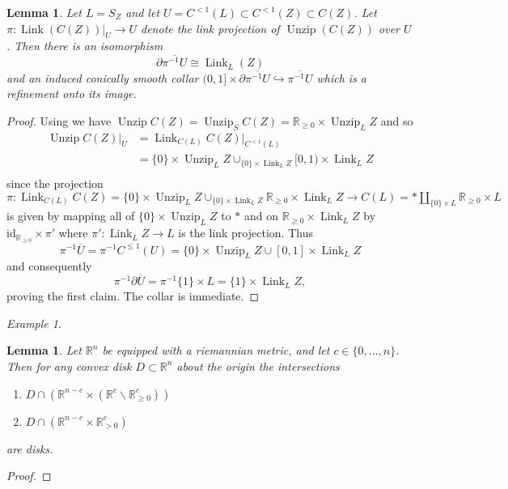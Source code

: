 \documentclass[11pt]{amsart}
\newcommand{\mbb}[1]{\mathbb{#1}}
\newcommand{\R}{\mbb{R}}
\newcommand{\id}{\mathrm{id}}
\DeclareMathOperator{\Unzip}{Unzip}
\DeclareMathOperator{\Link}{Link}
\numberwithin{equation}{section}
\theoremstyle{definition}
\theoremstyle{remark}
\newtheorem{example}[equation]{Example}
\theoremstyle{plain}
\newtheorem{lemma}[equation]{Lemma}
\begin{document}
\begin{lemma}\label{V6RIX5L}
    Let $L=S_Z$ and let $U=C^{<1}(L)\subset C^{<1}(Z)\subset C(Z)$. Let $\pi\colon \Link(C(Z))|_{U}\to U$ denote the link projection of $\Unzip (C(Z))$ over $U$. Then there is an isomorphism
    \[
        \partial\overline{\pi^{-1}U}\cong \Link_L(Z)
    \]
    and an induced conically smooth collar 
    \(
        (0,1]\times\partial\overline{\pi^{-1}U}\hookrightarrow \overline{\pi^{-1}U}
    \)
    which is a refinement onto its image.
\end{lemma}
\begin{proof}
    Using  we have $\Unzip C(Z)=\Unzip_{S}C(Z)=\R_{\geq0}\times\Unzip_L Z$ and so 
    \begin{align*}
        \Unzip C(Z)|_{U}&=\Link_{C(L)}C(Z)|_{C^{<1}(L)}\\
        &=\{0\}\times \Unzip_L Z\cup_{\{0\}\times\Link_LZ}[0,1)\times\Link_L Z\\
    \end{align*}
    since the projection $\pi\colon\Link_{C(L)}C(Z)=\{0\}\times\Unzip_L Z\cup_{\{0\}\times\Link_LZ}\R_{\geq0}\times \Link_L Z\to C(L)=\ast\amalg_{\{0\}\times L}\R_{\geq0}\times L$ is given by mapping all of $\{0\}\times\Unzip_L Z$ to $\ast$ and on $\R_{\geq0}\times \Link_LZ$ by $\id_{\R_{\geq0}}\times\pi'$ where $\pi'\colon \Link_LZ\to L$ is the link projection.
    Thus 
    \[
        \pi^{-1}\overline{U}=\pi^{-1}C^{\leq 1}(U)=\{0\}\times\Unzip_LZ\cup[0,1]\times\Link_LZ 
    \]
    and consequently 
    \begin{equation}\label{QX54WZB}
        \pi^{-1}\partial\overline{U}=\pi^{-1}\{1\}\times L=\{1\}\times\Link_L Z,
    \end{equation}
    proving the first claim. The collar is immediate.
\end{proof}

\begin{example}
    
\end{example}

\begin{lemma}\label{FBLD2TE}
    Let $\R^n$ be equipped with a riemannian metric, and let $c\in\{0,\dots,n\}$. Then for any convex disk $D\subset\R^n$ about the origin the intersections
    \begin{enumerate}
        \item $D\cap (\R^{n-c}\times(\R^{c}\smallsetminus\R^{c}_{\geq0}))$
        \item $D \cap (\R^{n-c}\times\R^{c}_{>0})$
    \end{enumerate}
    are disks.
\end{lemma}
\begin{proof}
    
\end{proof}
\end{document}
